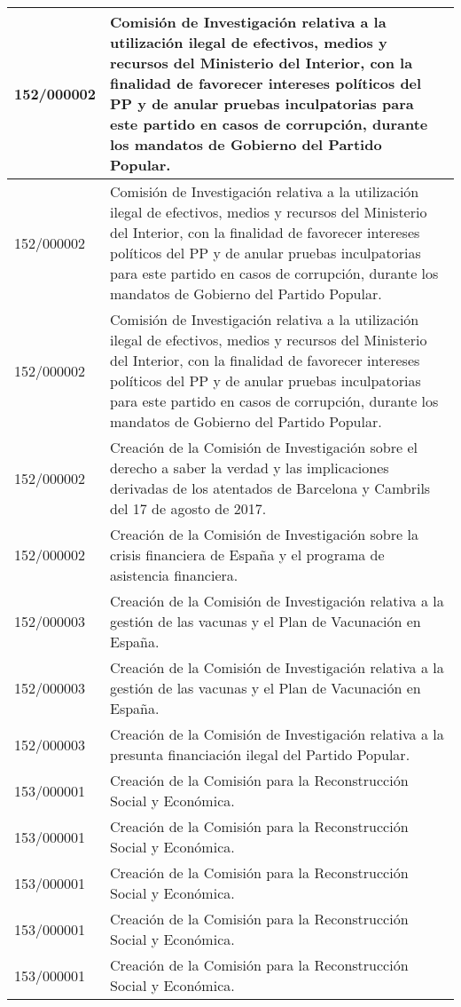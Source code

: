 {\begin{table}[H]
\begin{center}
\begin{tabularx}{\linewidth}{| l | X |}
\hline
152/000002 & Comisión de Investigación relativa a la utilización ilegal de efectivos, medios y recursos del Ministerio del Interior, con la finalidad de favorecer intereses políticos del PP y de anular pruebas inculpatorias para este partido en casos de corrupción, durante los mandatos de Gobierno del Partido Popular. \\
\hline
152/000002 & Comisión de Investigación relativa a la utilización ilegal de efectivos, medios y recursos del Ministerio del Interior, con la finalidad de favorecer intereses políticos del PP y de anular pruebas inculpatorias para este partido en casos de corrupción, durante los mandatos de Gobierno del Partido Popular. \\
\hline
152/000002 & Comisión de Investigación relativa a la utilización ilegal de efectivos, medios y recursos del Ministerio del Interior, con la finalidad de favorecer intereses políticos del PP y de anular pruebas inculpatorias para este partido en casos de corrupción, durante los mandatos de Gobierno del Partido Popular. \\
\hline
152/000002 & Creación de la Comisión de Investigación sobre el derecho a saber la verdad y las implicaciones derivadas de los atentados de Barcelona y Cambrils del 17 de agosto de 2017. \\
\hline
152/000002 & Creación de la Comisión de Investigación sobre la crisis financiera de España y el programa de asistencia financiera. \\
\hline
152/000003 & Creación de la Comisión de Investigación relativa a la gestión de las vacunas y el Plan de Vacunación en España. \\
\hline
152/000003 & Creación de la Comisión de Investigación relativa a la gestión de las vacunas y el Plan de Vacunación en España. \\
\hline
152/000003 & Creación de la Comisión de Investigación relativa a la presunta financiación ilegal del Partido Popular. \\
\hline
153/000001 & Creación de la Comisión para la Reconstrucción Social y Económica. \\
\hline
153/000001 & Creación de la Comisión para la Reconstrucción Social y Económica. \\
\hline
153/000001 & Creación de la Comisión para la Reconstrucción Social y Económica. \\
\hline
153/000001 & Creación de la Comisión para la Reconstrucción Social y Económica. \\
\hline
153/000001 & Creación de la Comisión para la Reconstrucción Social y Económica. \\

\end{tabularx}
\end{center}
\end{table}}
